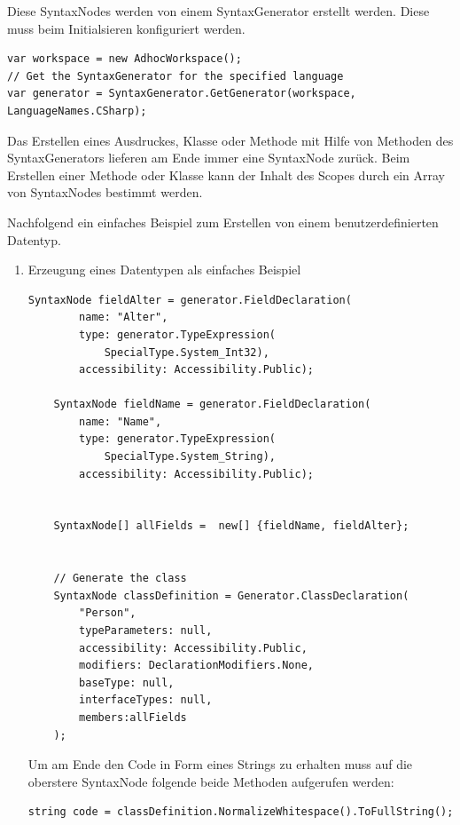 Diese SyntaxNodes werden von einem SyntaxGenerator erstellt werden.
Diese muss beim Initialsieren konfiguriert werden.

\begin{lstlisting}[caption=SyntaxGenerator für C\# erhalten]
var workspace = new AdhocWorkspace();
// Get the SyntaxGenerator for the specified language
var generator = SyntaxGenerator.GetGenerator(workspace, LanguageNames.CSharp);
\end{lstlisting}


Das Erstellen eines Ausdruckes, Klasse oder Methode mit Hilfe von Methoden
des SyntaxGenerators lieferen am Ende immer eine SyntaxNode zurück.
Beim Erstellen einer Methode oder Klasse kann der Inhalt des Scopes durch
ein Array von SyntaxNodes bestimmt werden.

Nachfolgend ein einfaches Beispiel zum Erstellen von einem
benutzerdefinierten Datentyp.

\begin{enumerate}
	\item Erzeugung eines Datentypen als einfaches Beispiel
	\label{sec:orgheadline42}
	
	\begin{lstlisting}[caption=Erzeugung einer Person-Klasse mit Roslyn]
	SyntaxNode fieldAlter = generator.FieldDeclaration(
		name: "Alter",
		type: generator.TypeExpression(
			SpecialType.System_Int32),
		accessibility: Accessibility.Public);
	
	SyntaxNode fieldName = generator.FieldDeclaration(
		name: "Name",
		type: generator.TypeExpression(
			SpecialType.System_String),
		accessibility: Accessibility.Public);
	
	
	SyntaxNode[] allFields =  new[] {fieldName, fieldAlter};
	
	
	// Generate the class
	SyntaxNode classDefinition = Generator.ClassDeclaration(
		"Person", 
		typeParameters: null,
		accessibility: Accessibility.Public,
		modifiers: DeclarationModifiers.None,
		baseType: null,
		interfaceTypes: null,
		members:allFields
	);
	\end{lstlisting}
	
	Um am Ende den Code in Form eines Strings zu erhalten muss auf die oberstere
	SyntaxNode folgende beide Methoden aufgerufen werden:
	
	\begin{lstlisting}[caption=Erhalten des Codes als string]
	string code = classDefinition.NormalizeWhitespace().ToFullString();
	\end{lstlisting}
\end{enumerate}


